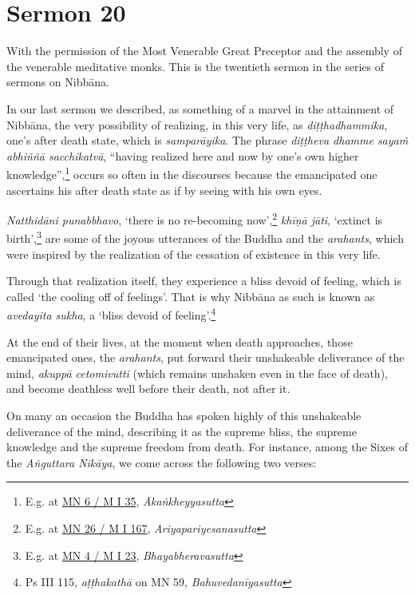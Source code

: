 \chapter{Sermon 20}

\NibbanaOpeningQuote

With the permission of the Most Venerable Great Preceptor and the assembly of the venerable meditative monks. This is the twentieth sermon in the series of sermons on Nibbāna.

In our last sermon we described, as something of a marvel in the attainment of Nibbāna, the very possibility of realizing, in this very life, as \emph{diṭṭhadhammika}, one's after death state, which is \emph{samparāyika}. The phrase \emph{diṭṭheva dhamme sayaṁ abhiññā sacchikatvā}, ``having realized here and now by one's own higher knowledge'',\footnote{E.g. at \href{https://suttacentral.net/mn6/pli/ms}{MN 6 / M I 35}, \emph{Ākaṅkheyyasutta}} occurs so often in the discourses because the emancipated one ascertains his after death state as if by seeing with his own eyes.

\enlargethispage{\baselineskip}

\emph{Natthidāni punabbhavo}, `there is no re-becoming now',\footnote{E.g. at \href{https://suttacentral.net/mn26/pli/ms}{MN 26 / M I 167}, \emph{Ariyapariyesanasutta}} \emph{khīṇā jāti}, `extinct is birth',\footnote{E.g. at \href{https://suttacentral.net/mn4/pli/ms}{MN 4 / M I 23}, \emph{Bhayabheravasutta}} are some of the joyous utterances of the Buddha and the \emph{arahants}, which were inspired by the realization of the cessation of existence in this very life.

Through that realization itself, they experience a bliss devoid of feeling, which is called `the cooling off of feelings'. That is why Nibbāna as such is known as \emph{avedayita sukha}, a `bliss devoid of feeling'.\footnote{Ps III 115, \emph{aṭṭhakathā} on MN 59, \emph{Bahuvedanīyasutta}}

At the end of their lives, at the moment when death approaches, those emancipated ones, the \emph{arahants}, put forward their unshakeable deliverance of the mind, \emph{akuppā cetomivutti} (which remains unshaken even in the face of death), and become deathless well before their death, not after it.

On many an occasion the Buddha has spoken highly of this unshakeable deliverance of the mind, describing it as the supreme bliss, the supreme knowledge and the supreme freedom from death. For instance, among the Sixes of the \emph{Aṅguttara Nikāya}, we come across the following two verses:

